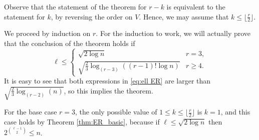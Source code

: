 \documentclass[11pt]{article}
\let\oldendproof\endproof
\renewenvironment{proof}[1][\proofname]{%
	\oldproof[\bf #1]%
}{\oldendproof}
\theoremstyle{plain}
\begin{document}
\begin{proof}

     Observe that the statement of the theorem for $r-k$ is equivalent to the statement for $k$, by reversing the order on $V$. Hence, we may assume that $k \leq \lfloor \frac{r}{2} \rfloor$. 

     We proceed by induction on $r$. For the induction to work, we will actually prove that the conclusion of the theorem holds if 
     \begin{equation}\label{eq:ell ER}
      \ell \leq 
     \begin{cases}
         \sqrt{2\log n} & r = 3, \\
         \sqrt{\frac{2}{3}\log_{(r-3)}\left((r-1)!\log n\right)} & r \geq 4.
     \end{cases}
     \end{equation}
     It is easy to see that both expressions in \eqref{eq:ell ER} are larger than $\sqrt{\frac{2}{3}\log_{(r-2)}(n)}$, so this implies the theorem.
     
     For the base case $r=3$, the only possible value of $1 \leq k \leq \lfloor \frac{r}{2} \rfloor$ is $k=1$, and this case holds by Theorem \ref{thm:ER_basic}, because if $\ell \leq \sqrt{2\log n}$ then $2^{\binom{\ell-1}{2}} \leq n$. 
     

\end{proof}
\end{document}
